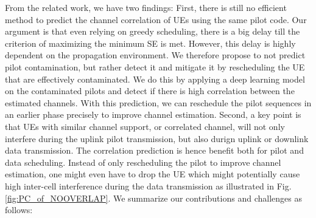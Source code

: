 From the related work, we have two findings: First, there is still no efficient method to predict %
the channel correlation of UEs %
using the same pilot code. Our argument is that even relying on greedy scheduling, there is a big delay till the criterion of maximizing the minimum SE is met. However, this delay is highly dependent on the propagation environment. 
We therefore propose to not predict pilot contamination, but rather detect it and mitigate it by rescheduling the UE that are effectively contaminated. We do this by applying a deep learning model on the contaminated pilots and detect if there is high correlation between the estimated channels. %
With this prediction, we can reschedule the pilot sequences in an earlier phase precisely to improve channel estimation. %
Second, a key point is that UEs with similar channel support, or correlated channel, will not only interfere during the uplink pilot transmission, but also durign uplink or downlink data transmission. The correlation prediction is hence benefit both for pilot and data scheduling.
Instead of only rescheduling the pilot to improve channel estimation, one might even have to drop the UE which might potentially cause high inter-cell interference during the data transmission as illustrated in Fig. \ref{fig:PC_of_NOOVERLAP}.  %
We summarize our contributions and challenges as follows:

